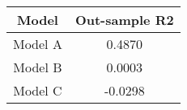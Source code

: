 \begin{tabular}{cc}
\hline
  Model  &  Out-sample R2  \\
\hline
 Model A &     0.4870      \\
 Model B &     0.0003      \\
 Model C &     -0.0298     \\
\hline
\end{tabular}